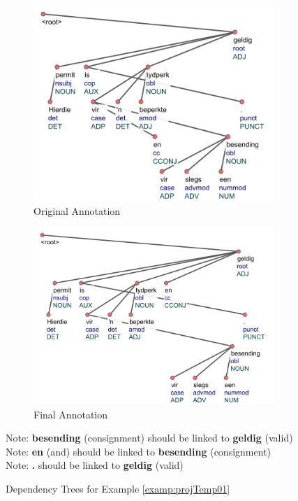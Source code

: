 \begin{figure}[H]
    \begin{subfigure}{\textwidth}
    \centering
    \includegraphics[scale=0.80]{img/projTempFix01-orig.png}
    \caption{Original Annotation}
    \label{projTempFix01-orig}  
    \end{subfigure}
    \begin{subfigure}{\textwidth}
    \centering
    \includegraphics[scale=0.80]{img/projTempFix01-mod.png}
    \caption{Final Annotation}
    \label{projTempFix01-mod}  
    \end{subfigure}
    \caption{Dependency Trees for Example \ref{examp:projTemp01}}
    Note: \textbf{besending} (consignment) should be linked to \textbf{geldig} (valid)\\
    Note: \textbf{en} (and) should be linked to \textbf{besending} (consignment)\\
    Note: \textbf{.} should be linked to \textbf{geldig} (valid)
    \label{fig:projTemp01}
\end{figure}


